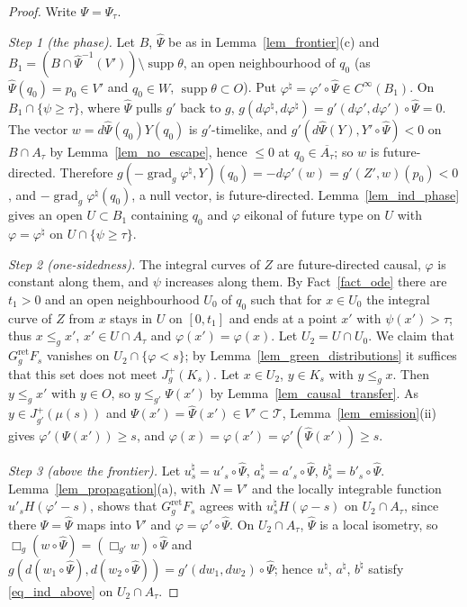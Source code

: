 \documentclass[11pt,a4paper,reqno]{amsart}
\theoremstyle{definition}
\numberwithin{equation}{section}
\newcommand{\cT}{\mathcal{T}}
\newcommand{\supp}{\operatorname{supp}}
\newcommand{\grad}{\operatorname{grad}}
\newcommand{\ret}{\mathrm{ret}}
\begin{document}
\begin{proof}
Write $\Psi=\Psi_\tau$.

\emph{Step 1 (the phase).} Let $B$, $\hat\Psi$ be as in Lemma~\ref{lem_frontier}(c) and
$B_1=(B\cap\hat\Psi^{-1}(V'))\setminus\supp\theta$, an open neighbourhood of $q_0$ (as $\hat\Psi(q_0)=p_0\in V'$ and
$q_0\in W$, $\supp\theta\subset O$). Put $\varphi^\natural=\varphi'\circ\hat\Psi\in C^\infty(B_1)$. On
$B_1\cap\{\psi\ge\tau\}$, where $\hat\Psi$ pulls $g'$ back to $g$, $g(d\varphi^\natural,d\varphi^\natural)
=g'(d\varphi',d\varphi')\circ\hat\Psi=0$. The vector $w=d\hat\Psi(q_0)Y(q_0)$ is $g'$-timelike, and
$g'(d\hat\Psi(Y),Y'\circ\hat\Psi)<0$ on $B\cap A_\tau$ by Lemma~\ref{lem_no_escape}, hence $\le0$ at $q_0\in\overline{A_\tau}$;
so $w$ is future-directed. Therefore $g(-\grad_g\varphi^\natural,Y)(q_0)=-d\varphi'(w)=g'(Z',w)(p_0)<0$, and
$-\grad_g\varphi^\natural(q_0)$, a null vector, is future-directed. Lemma~\ref{lem_ind_phase} gives an open
$U\subset B_1$ containing $q_0$ and $\varphi$ eikonal of future type on $U$ with $\varphi=\varphi^\natural$ on
$U\cap\{\psi\ge\tau\}$.

\emph{Step 2 (one-sidedness).} The integral curves of $Z$ are future-directed causal, $\varphi$ is constant along them,
and $\psi$ increases along them. By Fact~\ref{fact_ode} there are $t_1>0$ and an open neighbourhood $U_0$ of $q_0$ such
that for $x\in U_0$ the integral curve of $Z$ from $x$ stays in $U$ on $[0,t_1]$ and ends at a point $x'$ with
$\psi(x')>\tau$; thus $x\le_gx'$, $x'\in U\cap A_\tau$ and $\varphi(x')=\varphi(x)$. Let $U_2=U\cap U_0$. We claim that
$G^\ret_gF_s$ vanishes on $U_2\cap\{\varphi<s\}$; by Lemma~\ref{lem_green_distributions} it suffices that this set does not
meet $J^+_g(K_s)$. Let $x\in U_2$, $y\in K_s$ with $y\le_gx$. Then $y\le_gx'$ with $y\in O$, so $y\le_{g'}\Psi(x')$ by
Lemma~\ref{lem_causal_transfer}. As $y\in J^+_{g'}(\mu(s))$ and $\Psi(x')=\hat\Psi(x')\in V'\subset\cT$, Lemma~\ref{lem_emission}(ii)
gives $\varphi'(\Psi(x'))\ge s$, and $\varphi(x)=\varphi(x')=\varphi'(\hat\Psi(x'))\ge s$.

\emph{Step 3 (above the frontier).} Let $u^\natural_s=u'_s\circ\hat\Psi$, $a^\natural_s=a'_s\circ\hat\Psi$,
$b^\natural_s=b'_s\circ\hat\Psi$. Lemma~\ref{lem_propagation}(a), with $N=V'$ and the locally integrable function
$u'_sH(\varphi'-s)$, shows that $G^\ret_gF_s$ agrees with $u^\natural_sH(\varphi-s)$ on $U_2\cap A_\tau$, since there
$\Psi=\hat\Psi$ maps into $V'$ and $\varphi=\varphi'\circ\hat\Psi$. On $U_2\cap A_\tau$, $\hat\Psi$ is a local isometry, so
$\Box_g(w\circ\hat\Psi)=(\Box_{g'}w)\circ\hat\Psi$ and $g(d(w_1\circ\hat\Psi),d(w_2\circ\hat\Psi))
=g'(dw_1,dw_2)\circ\hat\Psi$; hence $u^\natural$, $a^\natural$, $b^\natural$ satisfy \eqref{eq_ind_above} on
$U_2\cap A_\tau$.


\end{proof}
\end{document}
